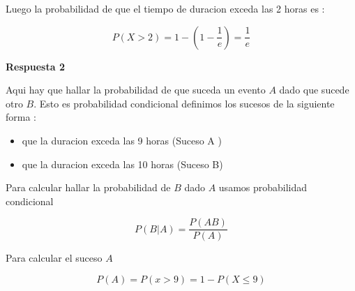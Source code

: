 \documentclass{article}
\begin{document}
\begin{flushleft}
        Luego la probabilidad de que el tiempo de duracion exceda las 2 horas es : 

        \begin{equation*}
            P \left(X > 2 \right) = 1 - \left(1 - \frac{1}{e}\right)  = \frac{1}{e} 
        \end{equation*}


        {\bf Respuesta 2 } 

        Aqui hay que hallar la probabilidad de que suceda un evento $A$ dado que sucede otro $B$.
        Esto es probabilidad condicional definimos los sucesos de la siguiente forma :

        \begin{itemize}
            \item que la duracion exceda las 9 horas (Suceso A )
            \item que la duracion exceda las 10 horas (Suceso B)
        \end{itemize}
        
        Para calcular hallar la probabilidad de $B$ dado $A$ usamos probabilidad condicional 
        
        \begin{equation*}
            P \left(B | A  \right) = \frac{P \left(AB\right)}{P\left(A\right)}
        \end{equation*}

        Para calcular el suceso $A$ 

        \begin{equation*}
            P\left(A \right) = P \left(x > 9 \right) = 1 - P \left(X \le 9 \right)
        \end{equation*}


\end{flushleft}
\end{document}
